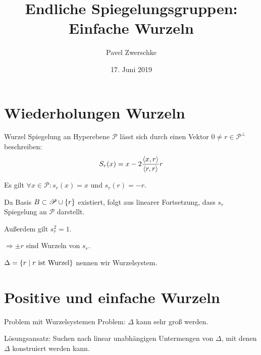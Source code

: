 \documentclass{beamer}
\title[Einfache Wurzeln]{Endliche Spiegelungsgruppen:\\
Einfache Wurzeln}
\author{Pavel Zwerschke}
\date{17. Juni 2019}
\begin{document}
\begin{frame}
    \maketitle
\end{frame}

\begin{frame}
    \tableofcontents
\end{frame}

\section{Wiederholungen Wurzeln}

\begin{frame}{Wurzel}
    Spiegelung an Hyperebene \( \mathscr{P} \) 
    lässt sich durch einen Vektor
    \( 0 \neq r \in \mathscr{P}^{\bot} \)
    beschreiben:
    \[ S_r(x) = x 
    - 2\frac{\langle x, r \rangle}{\langle r, r \rangle} r \]
    \pause
    
    Es gilt \( \forall x \in \mathscr{P}: s_r(x) = x \) 
    und \( s_r(r) = -r \). \pause

    Da Basis \( B \subset \mathscr{P} \cup \{r\} \) 
    existiert, folgt aus linearer Fortsetzung, dass 
    \( s_r \) Spiegelung an \( \mathscr{P} \) darstellt.

    \pause
    Außerdem gilt \( s_r^2 = 1 \).

    \( \Rightarrow \pm r \) sind Wurzeln von \( s_r \).

    \( \Delta = \{ r \;\vert\; r \text{ ist Wurzel} \} \) 
    nennen wir Wurzelsystem.
\end{frame}
\section{Positive und einfache Wurzeln}
\begin{frame}{Problem mit Wurzelsystemen}
    Problem: \( \Delta \) kann sehr groß werden. \pause

    Lösungsansatz: Suchen nach linear unabhängigen 
    Untermengen von \( \Delta \), mit denen \( \Delta \)
    konstruiert werden kann.
\end{frame}
\end{document}

